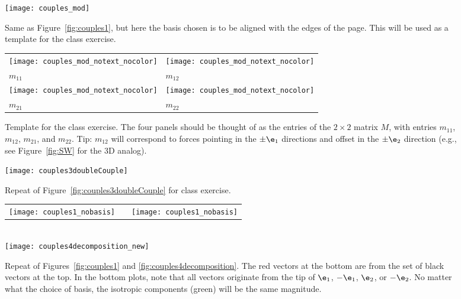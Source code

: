 \documentclass[11pt,titlepage,fleqn]{article}
\begin{document}
\begin{figure}
\centering
\texttt{[image: couples\_mod]}
\caption{
Same as Figure~\ref{fig:couples1}, but here the basis chosen is to be aligned with the edges of the page.
This will be used as a template for the class exercise.
\label{fig:template}
}
\end{figure}


\begin{figure}
\centering
\begin{tabular}{|l|l|}
\hline
\texttt{[image: couples\_mod\_notext\_nocolor]} & 
\texttt{[image: couples\_mod\_notext\_nocolor]} \\
$m_{11}$ & $m_{12}$ \\ \hline
\texttt{[image: couples\_mod\_notext\_nocolor]} &
\texttt{[image: couples\_mod\_notext\_nocolor]} \\
$m_{21}$ & $m_{22}$ \\ \hline
\end{tabular}
\caption{
Template for the class exercise.
The four panels should be thought of as the entries of the $2 \times 2$ matrix $M$, with entries $m_{11}$, $m_{12}$, $m_{21}$, and $m_{22}$.
Tip: $m_{12}$ will correspond to forces pointing in the $\pm\e_1$ directions and offset in the $\pm\e_2$ direction (e.g., see Figure~\ref{fig:SW} for the 3D analog).
\label{fig:template4}
}
\end{figure}

\begin{figure}
\hspace{-1cm}
\texttt{[image: couples3doubleCouple]}
\caption{
Repeat of Figure~\ref{fig:couples3doubleCouple} for class exercise.
\label{fig:templateDC}
}
\end{figure}

\begin{figure}
\centering
\begin{tabular}{ccc}
\texttt{[image: couples1\_nobasis]}
& \hspace{1.4cm} &
\texttt{[image: couples1\_nobasis]}
\end{tabular}
\\
\makebox{\hspace{0.5cm}}
\texttt{[image: couples4decomposition\_new]}
\caption{
Repeat of Figures~\ref{fig:couples1} and \ref{fig:couples4decomposition}.
The red vectors at the bottom are from the set of black vectors at the top.
In the bottom plots, note that all vectors originate from the tip of $\e_1$, $-\e_1$, $\e_2$, or $-\e_2$.
No matter what the choice of basis, the isotropic components (green) will be the same magnitude.
\label{fig:decom}
}
\end{figure}
\end{document}
